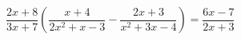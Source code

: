 \begin{ex}[type=equation]
	\begin{condition}
		$\dfrac{2x + 8}{3x + 7}\left(\dfrac{x + 4}{2x^2 + x-3} - \dfrac{2x + 3}{x^2 + 3x - 4}\right) = \dfrac{6x - 7}{2x + 3}$
	\end{condition}
\end{ex}